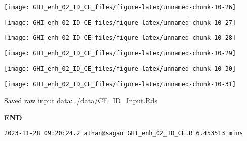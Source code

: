 \documentclass[
  10pt,
  a4paper,oneside]{article}
\begin{document}
\begin{center}\texttt{[image: GHI\_enh\_02\_ID\_CE\_files/figure-latex/unnamed-chunk-10-26]} \end{center}

\begin{center}\texttt{[image: GHI\_enh\_02\_ID\_CE\_files/figure-latex/unnamed-chunk-10-27]} \end{center}

\begin{center}\texttt{[image: GHI\_enh\_02\_ID\_CE\_files/figure-latex/unnamed-chunk-10-28]} \end{center}

\begin{center}\texttt{[image: GHI\_enh\_02\_ID\_CE\_files/figure-latex/unnamed-chunk-10-29]} \end{center}

\begin{center}\texttt{[image: GHI\_enh\_02\_ID\_CE\_files/figure-latex/unnamed-chunk-10-30]} \end{center}

\begin{center}\texttt{[image: GHI\_enh\_02\_ID\_CE\_files/figure-latex/unnamed-chunk-10-31]} \end{center}

Saved raw input data: ./data/CE\_ID\_Input.Rds

\textbf{END}

\begin{verbatim}
2023-11-28 09:20:24.2 athan@sagan GHI_enh_02_ID_CE.R 6.453513 mins
\end{verbatim}
\end{document}
